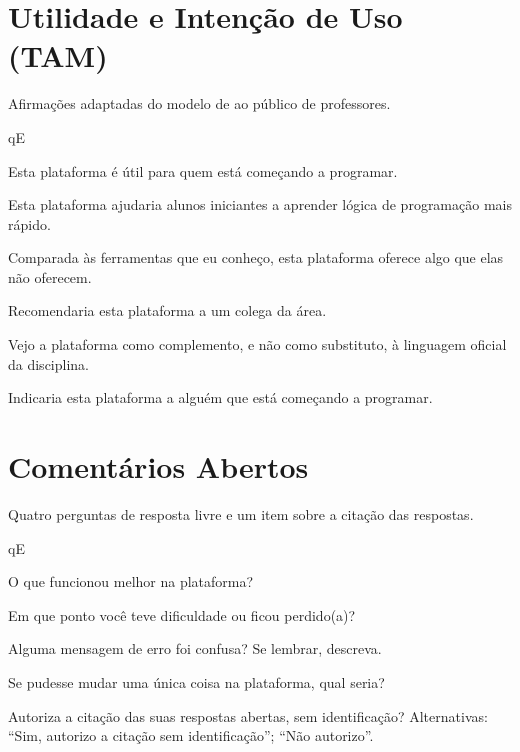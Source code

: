 \section{Utilidade e Intenção de Uso (TAM)}

Afirmações adaptadas do modelo de  ao público de professores.


\begin{questoes}{qE}
    \item\label{qE:tam-ini} Esta plataforma é útil para quem está começando a programar.
    \item Esta plataforma ajudaria alunos iniciantes a aprender lógica de programação mais rápido.
    \item Comparada às ferramentas que eu conheço, esta plataforma oferece algo que elas não oferecem.
    \item Recomendaria esta plataforma a um colega da área.
    \item Vejo a plataforma como complemento, e não como substituto, à linguagem oficial da disciplina.
    \item\label{qE:tam-fim} Indicaria esta plataforma a alguém que está começando a programar.
\end{questoes}


\section{Comentários Abertos}

Quatro perguntas de resposta livre e um item sobre a citação das respostas.


\begin{questoes}{qE}
    \item\label{qE:abertas-ini} O que funcionou melhor na plataforma?
    \item Em que ponto você teve dificuldade ou ficou perdido(a)?
    \item Alguma mensagem de erro foi confusa? Se lembrar, descreva.
    \item Se pudesse mudar uma única coisa na plataforma, qual seria?
    \item\label{qE:abertas-fim} Autoriza a citação das suas respostas abertas, sem identificação? Alternativas: ``Sim, autorizo a citação sem identificação''; ``Não autorizo''.
\end{questoes}
